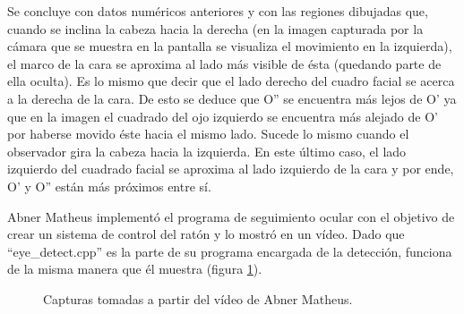 Se concluye con datos numéricos anteriores y con las regiones dibujadas que, cuando se inclina la cabeza hacia la derecha (en la imagen capturada por la cámara que se muestra en la pantalla se visualiza el movimiento en la izquierda), el marco de la cara se aproxima al lado más visible de ésta (quedando parte de ella oculta). Es lo mismo que decir que el lado derecho del cuadro facial se acerca a la derecha de la cara. De esto se deduce que O'' se encuentra más lejos de O' ya que en la imagen el cuadrado del ojo izquierdo se encuentra más alejado de O' por haberse movido éste hacia el mismo lado. Sucede lo mismo cuando el observador gira la cabeza hacia la izquierda. En este último caso, el lado izquierdo del cuadrado facial se aproxima al lado izquierdo de la cara y por ende, O' y O'' están más próximos entre sí.

Abner Matheus \citep{eyetracking} implementó el programa de seguimiento ocular con el objetivo de crear un sistema de control del ratón y lo mostró en un vídeo. Dado que ``eye\_detect.cpp'' es la parte de su programa encargada de la detección, funciona de la misma manera que él muestra (figura \ref{fig:abner}).

\begin{figure}[htbp]
\centering
{}
\caption{Capturas tomadas a partir del vídeo de Abner Matheus.} 
\label{fig:abner}
\end{figure}

